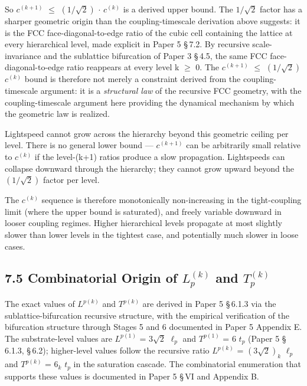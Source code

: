\documentclass[11pt,oneside]{report}
\theoremstyle{definition}
\theoremstyle{remark}
\begin{document}
So \ensuremath{c^{(k+1)}} \ensuremath{\leq} \ensuremath{(1/\sqrt{2})} \ensuremath{\cdot} \ensuremath{c^{(k)}} is a derived upper bound. The \ensuremath{1/\sqrt{2}}
factor has a sharper geometric origin than the coupling-timescale
derivation above suggests: it is the FCC face-diagonal-to-edge ratio of
the cubic cell containing the lattice at every hierarchical level, made
explicit in Paper 5 \S\,7.2. By recursive scale-invariance and the
sublattice bifurcation of Paper 3 \S\,4.5, the same FCC
face-diagonal-to-edge ratio reappears at every level k \ensuremath{\geq} 0. The
\ensuremath{c^{(k+1)}} \ensuremath{\leq} \ensuremath{(1/\sqrt{2})} \ensuremath{c^{(k)}} bound is therefore not merely a constraint
derived from the coupling-timescale argument: it is a \emph{structural
law} of the recursive FCC geometry, with the coupling-timescale argument
here providing the dynamical mechanism by which the geometric law is
realized.

Lightspeed cannot grow across the hierarchy beyond this geometric
ceiling per level. There is no general lower bound --- \ensuremath{c^{(k+1)}} can be
arbitrarily small relative to \ensuremath{c^{(k)}} if the level-(k+1) ratios produce
a slow propagation. Lightspeeds can collapse downward through the
hierarchy; they cannot grow upward beyond the \ensuremath{(1/\sqrt{2})} factor per level.

The \ensuremath{c^{(k)}} sequence is therefore monotonically non-increasing in the
tight-coupling limit (where the upper bound is saturated), and freely
variable downward in looser coupling regimes. Higher hierarchical levels
propagate at most slightly slower than lower levels in the tightest
case, and potentially much slower in loose cases.

\subsection*{7.5 Combinatorial Origin of \ensuremath{L_{p}^{(k)}} and \ensuremath{T_{p}^{(k)}}}

The exact values of \ensuremath{L^{p(k)}} and \ensuremath{T^{p(k)}} are derived in Paper 5 \S\,6.1.3
via the sublattice-bifurcation recursive structure, with the empirical
verification of the bifurcation structure through Stages 5 and 6
documented in Paper 5 Appendix E. The substrate-level values are \ensuremath{L^{p(1)}}
= \ensuremath{3\sqrt{2}} \ensuremath{\ell_{p}} and \ensuremath{T^{p(1)}} = 6 \ensuremath{t_{p}} (Paper 5 \S\,6.1.3, \S\,6.2); higher-level
values follow the recursive ratio \ensuremath{L^{p(k)}} = \ensuremath{(3\sqrt{2})_{k}} \ensuremath{\ell_{p}} and \ensuremath{T^{p(k)}} = \ensuremath{6_{k}}
\ensuremath{t_{p}} in the saturation cascade. The combinatorial enumeration that
supports these values is documented in Paper 5 \S\,VI and Appendix B.
\end{document}
